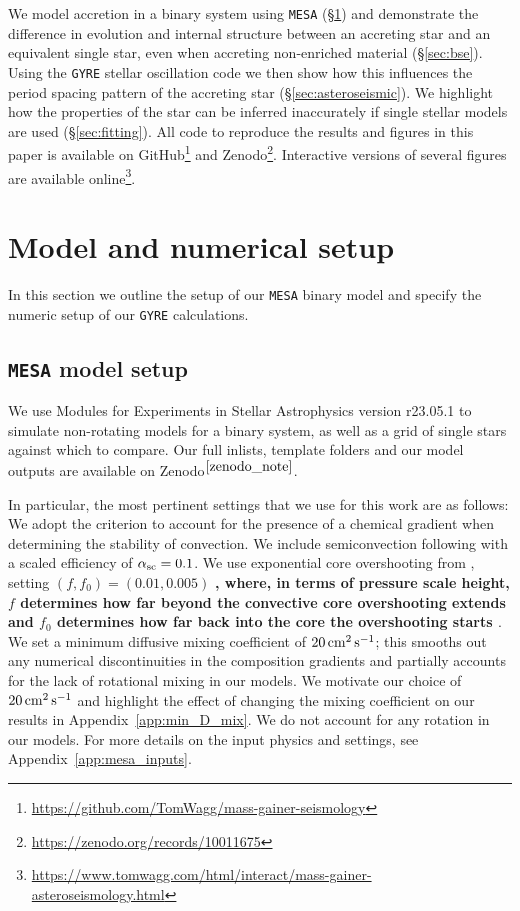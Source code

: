 \documentclass[desactivate]{aa}
\newcommand{\referee}[1]{{\bf #1}}
\begin{document}
We model accretion in a binary system using \texttt{MESA} (\S\ref{sec:methods}) and demonstrate the difference in evolution and internal structure between an accreting star and an equivalent single star, even when accreting non-enriched material (\S\ref{sec:bse}). Using the \texttt{GYRE} stellar oscillation code we then show how this influences the period spacing pattern of the accreting star (\S\ref{sec:asteroseismic}). We highlight how the properties of the star can be inferred inaccurately if single stellar models are used (\S\ref{sec:fitting}). All code to reproduce the results and figures in this paper is available on GitHub\footnote{\url{https://github.com/TomWagg/mass-gainer-seismology}} and Zenodo\footnote{\url{https://zenodo.org/records/10011675}\label{zenodo_note}}. Interactive versions of several figures are available online\footnote{\url{https://www.tomwagg.com/html/interact/mass-gainer-asteroseismology.html}}.

\section{Model and numerical setup} \label{sec:methods}

In this section we outline the setup of our \texttt{MESA} binary model and specify the numeric setup of our \texttt{GYRE} calculations.

\subsection{\texttt{MESA} model setup}\label{sec:model_setup}

We use Modules for Experiments in Stellar Astrophysics \citep[\texttt{MESA},][]{Paxton2011, Paxton2013, Paxton2015, Paxton2018, Paxton2019, Jermyn2023} version r23.05.1 \citep{mesa_zenodo} to simulate non-rotating models for a binary system, as well as a grid of single stars against which to compare. Our full inlists, template folders and our model outputs are available on Zenodo$^{\ref{zenodo_note}}$.

In particular, the most pertinent settings that we use for this work are as follows: We adopt the \citet{Ledoux+1947} criterion to account for the presence of a chemical gradient when determining the stability of convection. We include semiconvection following \citet{Langer+1983} with a scaled efficiency of $\alpha_{\rm sc}=0.1$. We use exponential core overshooting from \cite{Herwig+2000}, setting $(f, f_0) = (0.01, 0.005)$ \citep{Claret+2017}\referee{, where, in terms of pressure scale height, $f$ determines how far beyond the convective core overshooting extends and $f_0$ determines how far back into the core the overshooting starts \citep[see][for more details]{Herwig+2000, Paxton2011}}. We set a minimum diffusive mixing coefficient of $20\,{\rm cm^2 \, s^{-1}}$; this smooths out any numerical discontinuities in the composition gradients and partially accounts for the lack of rotational mixing in our models. We motivate our choice of $20\,{\rm cm^2 \, s^{-1}}$ and highlight the effect of changing the mixing coefficient on our results in Appendix~\ref{app:min_D_mix}. We do not account for any rotation in our models. For more details on the input physics and settings, see Appendix~\ref{app:mesa_inputs}. 
\end{document}
